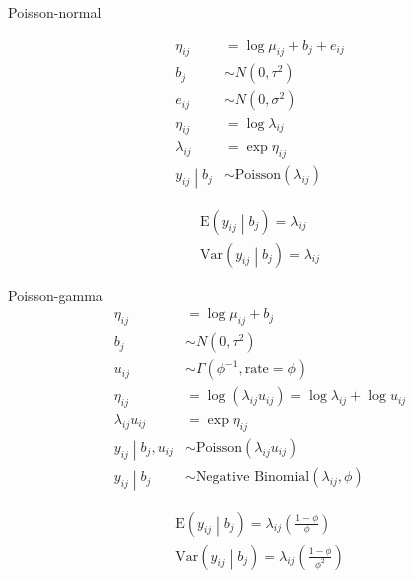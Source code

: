 \documentclass{article}
\begin{document}
Poisson-normal

\begin{align*}
\eta_{ij} & = \log{\mu_{ij}} + b_j + e_{ij} \\
b_j & \sim N\left(0, \tau^2\right) \\
e_{ij} & \sim N\left(0, \sigma^2\right) \\
\eta_{ij} & = \log{\lambda_{ij}} \\
\lambda_{ij} & = \exp{\eta_{ij}} \\
\left.y_{ij} \middle| b_j\right. & \sim \text{Poisson}\left(\lambda_{ij}\right)
\end{align*}

\begin{align*}
\text{E}\left(\left.y_{ij} \middle| b_j\right.\right) = \lambda_{ij} \\
\text{Var}\left(\left.y_{ij} \middle| b_j\right.\right) = \lambda_{ij}
\end{align*}



Poisson-gamma
\begin{align*}
\eta_{ij} & = \log{\mu_{ij}} + b_j \\
b_j & \sim N\left(0, \tau^2\right) \\
u_{ij} & \sim \Gamma\left(\phi^{-1}, \text{rate}=\phi\right) \\
\eta_{ij} & = \log{\left(\lambda_{ij} u_{ij} \right)} = \log{\lambda_{ij}} + \log{u_{ij}} \\
\lambda_{ij} u_{ij} & = \exp{\eta_{ij}} \\
\left.y_{ij} \middle| b_j, u_{ij}\right. & \sim \text{Poisson}\left(\lambda_{ij} u_{ij}\right) \\
\left.y_{ij} \middle| b_j \right. & \sim \text{Negative Binomial}\left(\lambda_{ij}, \phi\right)
\end{align*}

\begin{align*}
\text{E}\left(\left.y_{ij} \middle| b_j\right.\right) = \lambda_{ij} \left(\frac{1-\phi}{\phi}\right) \\
\text{Var}\left(\left.y_{ij} \middle| b_j\right.\right) = \lambda_{ij} \left(\frac{1-\phi}{\phi^2}\right)
\end{align*}
\end{document}

